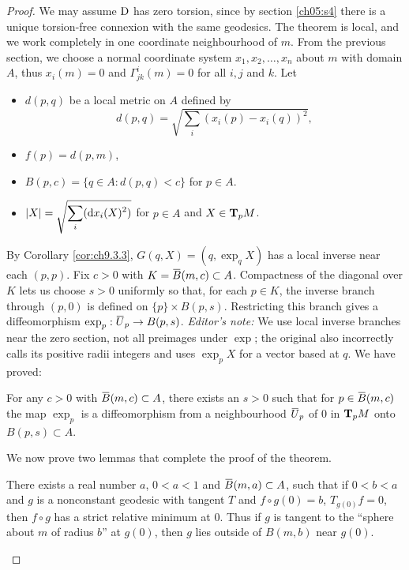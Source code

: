 \documentclass[../main]{subfiles}
\begin{document}
\begin{proof}
We may assume $\connection$ has zero torsion, since by section \ref{ch05:s4} there is a unique torsion-free connexion with the same geodesics. The theorem is local, and we work completely in one coordinate neighbourhood of $m$. From the previous section, we choose a normal coordinate system $x_1, x_2, \dots, x_n$ about $m$ with domain $A$, thus $x_i(m) = 0$ and $\Gamma^i_{jk}(m) = 0$ for all $i, j$ and $k$. Let 
\begin{itemize}
    \item $d(p,q)$ be a local metric on $A$ defined by \[d(p,q) = \sqrt{\sum_{i} (x_i(p) - x_i(q))^2},\]
    \item $f(p) = d(p,m)$,
    \item $B(p,c) = \{q\in A: d(p,q)<c\}$ for $p\in A$.
    \item $\norm{X} = \sqrt{\displaystyle \sum_{i} (\dd{x_i}(X)^2)} $ for $p\in A$ and $X\in \tangentspace{M}{p}$.
\end{itemize}

By Corollary \ref{cor:ch9.3.3}, $G(q,X)=(q,\exp_qX)$ has a local inverse near each $(p,p)$. Fix $c>0$ with $K=\xoverline B(m,c)\subset A$. Compactness of the diagonal over $K$ lets us choose $s>0$ uniformly so that, for each $p\in K$, the inverse branch through $(p,0)$ is defined on $\{p\}\times B(p,s)$. Restricting this branch gives a diffeomorphism $\exp_p:\xoverline U_p\functionMaps B(p,s)$. \emph{Editor's note:} We use local inverse branches near the zero section, not all preimages under $\exp$; the original also incorrectly calls its positive radii integers and uses $\exp_pX$ for a vector based at $q$. We have proved:


\begin{lemma}\label{lem:ch9.4.1a}
For any $c>0$ with $\xoverline{B}(m,c)\subset A$, there exists an $s>0$ such that for $p\in \xoverline{B}(m,c)$ the map $\exp_p$ is a diffeomorphism from a neighbourhood $\xoverline{U}_p$ of 0 in $\tangentspace{M}{p}$ onto $B(p,s)\subset A$.

We now prove two lemmas that complete the proof of the theorem. 
\end{lemma}


\begin{lemma} \label{lem:ch9.4.1b}
There exists a real number $a$, $0<a<1$ and $\xoverline{B}(m,a)\subset A$, such that if $0<b<a$ and $g$ is a nonconstant geodesic with tangent $T$ and $f\circ g(0)=b$, $T_{g(0)} f = 0$, then $f\circ g$ has a strict relative minimum at $0$. Thus if $g$ is tangent to the ``sphere about $m$ of radius $b$'' at $g(0)$, then $g$ lies outside of $B(m,b)$ near $g(0)$.
\end{lemma}


\end{proof}
\end{document}
